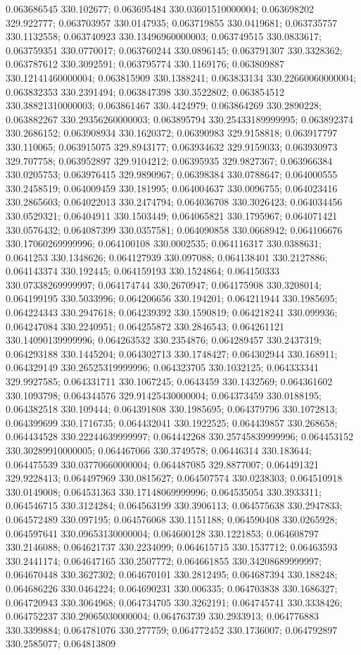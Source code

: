 0.063686545 330.102677; 0.063695484 330.03601510000004; 0.063698202 329.922777; 0.063703957 330.0147935; 0.063719855 330.0419681; 0.063735757 330.1132558; 0.063740923 330.13496960000003; 0.063749515 330.0833617; 0.063759351 330.0770017; 0.063760244 330.0896145; 0.063791307 330.3328362; 0.063787612 330.3092591; 0.063795774 330.1169176; 0.063809887 330.12141460000004; 0.063815909 330.1388241; 0.063833134 330.22660060000004; 0.063832353 330.2391494; 0.063847398 330.3522802; 0.063854512 330.38821310000003; 0.063861467 330.4424979; 0.063864269 330.2890228; 0.063882267 330.29356260000003; 0.063895794 330.25433189999995; 0.063892374 330.2686152; 0.063908934 330.1620372; 0.06390983 329.9158818; 0.063917797 330.110065; 0.063915075 329.8943177; 0.063934632 329.9159033; 0.063930973 329.707758; 0.063952897 329.9104212; 0.06395935 329.9827367; 0.063966384 330.0205753; 0.063976415 329.9890967; 0.06398384 330.0788647; 0.064000555 330.2458519; 0.064009459 330.181995; 0.064004637 330.0096755; 0.064023416 330.2865603; 0.064022013 330.2474794; 0.064036708 330.3026423; 0.064034456 330.0529321; 0.06404911 330.1503449; 0.064065821 330.1795967; 0.064071421 330.0576432; 0.064087399 330.0357581; 0.064090858 330.0668942; 0.064106676 330.17060269999996; 0.064100108 330.0002535; 0.064116317 330.0388631; 0.0641253 330.1348626; 0.064127939 330.097088; 0.064138401 330.2127886; 0.064143374 330.192445; 0.064159193 330.1524864; 0.064150333 330.07338269999997; 0.064174744 330.2670947; 0.064175908 330.3208014; 0.064199195 330.5033996; 0.064206656 330.194201; 0.064211944 330.1985695; 0.064224343 330.2947618; 0.064239392 330.1590819; 0.064218241 330.099936; 0.064247084 330.2240951; 0.064255872 330.2846543; 0.064261121 330.14090139999996; 0.064263532 330.2354876; 0.064289457 330.2437319; 0.064293188 330.1445204; 0.064302713 330.1748427; 0.064302944 330.168911; 0.064329149 330.26525319999996; 0.064323705 330.1032125; 0.064333341 329.9927585; 0.064331711 330.1067245; 0.0643459 330.1432569; 0.064361602 330.1093798; 0.064344576 329.91425430000004; 0.064373459 330.0188195; 0.064382518 330.109444; 0.064391808 330.1985695; 0.064379796 330.1072813; 0.064399699 330.1716735; 0.064432041 330.1922525; 0.064439857 330.268658; 0.064434528 330.22244639999997; 0.064442268 330.25745839999996; 0.064453152 330.30289910000005; 0.064467066 330.3749578; 0.06446314 330.183644; 0.064475539 330.03770660000004; 0.064487085 329.8877007; 0.064491321 329.9228413; 0.064497969 330.0815627; 0.064507574 330.0238303; 0.064510918 330.0149008; 0.064531363 330.17148069999996; 0.064535054 330.3933311; 0.064546715 330.3124284; 0.064563199 330.3906113; 0.064575638 330.2947833; 0.064572489 330.097195; 0.064576068 330.1151188; 0.064590408 330.0265928; 0.064597641 330.09653130000004; 0.064600128 330.1221853; 0.064608797 330.2146088; 0.064621737 330.2234099; 0.064615715 330.1537712; 0.06463593 330.2441174; 0.064647165 330.2507772; 0.064661855 330.34208689999997; 0.064670448 330.3627302; 0.064670101 330.2812495; 0.064687394 330.188248; 0.064686226 330.0464224; 0.064690231 330.006335; 0.064703838 330.1686327; 0.064720943 330.3064968; 0.064734705 330.3262191; 0.064745741 330.3338426; 0.064752237 330.29065030000004; 0.064763739 330.2933913; 0.064776883 330.3399884; 0.064781076 330.277759; 0.064772452 330.1736007; 0.064792897 330.2585077; 0.064813809 